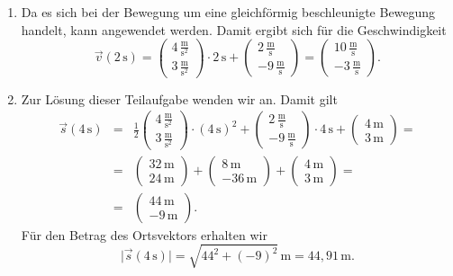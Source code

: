 \begin{MExercises}
\begin{MExercise}
     
     \begin{MSolution} 
     \begin{enumerate}
     \item Da es sich bei der Bewegung um eine gleichf\"ormig beschleunigte Bewegung handelt, kann  angewendet werden. Damit ergibt sich f\"ur die Geschwindigkeit
     $$
     \vec{v}(2\,\text{s})=\left(\begin{array}{c} 4\,\frac{\text{m}}{\text{s}^2} \\ 3\,\frac{\text{m}}{\text{s}^2} \end{array}\right)\cdot 2\,\text{s}+\left(\begin{array}{c} 2\,\frac{\text{m}}{\text{s}} \\ -9\,\frac{\text{m}}{\text{s}} \end{array}\right)=\left(\begin{array}{c} 10\,\frac{\text{m}}{\text{s}} \\ -3\,\frac{\text{m}}{\text{s}} \end{array}\right).
     $$
     \item Zur L\"osung dieser Teilaufgabe wenden wir  an. Damit gilt
     \begin{eqnarray*}
          \vec{s}(4\,\text{s})&=&\frac{1}{2}\left(\begin{array}{c} 4\,\frac{\text{m}}{\text{s}^2} \\ 3\,\frac{\text{m}}{\text{s}^2} \end{array}\right)\cdot \left(4\,\text{s}\right)^2+\left(\begin{array}{c} 2\,\frac{\text{m}}{\text{s}} \\ -9\,\frac{\text{m}}{\text{s}} \end{array}\right)\cdot4\,\text{s}+\left(\begin{array}{c} 4\,\text{m} \\ 3\,\text{m} \end{array}\right)=\\
          &=&\left(\begin{array}{c} 32\,\text{m} \\ 24\,\text{m} \end{array}\right)+\left(\begin{array}{c} 8\,\text{m} \\ -36\,\text{m} \end{array}\right)+\left(\begin{array}{c} 4\,\text{m} \\ 3\,\text{m} \end{array}\right)=\\
          &=&\left(\begin{array}{c} 44\,\text{m} \\ -9\,\text{m} \end{array}\right).
    \end{eqnarray*} F\"ur den Betrag des Ortsvektors erhalten wir
     $$
     \vert \vec{s}(4\,\text{s})\vert=\sqrt{44^2+(-9)^2}\,\text{m}={44,91}\,\text{m}.
     $$
     \end{enumerate}
     

\end{MSolution}
\end{MExercise}
\end{MExercises}
